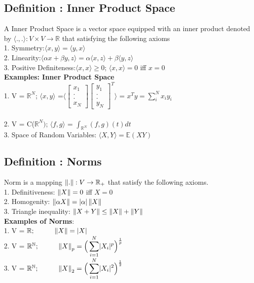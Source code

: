 \documentclass[a4paper,english,12pt]{article}
\newcommand\tab[1][1cm]{\hspace*{#1}}
\begin{document}
\subsection{Definition : Inner Product Space}
A Inner Product Space is a vector space equipped with an inner product denoted by $\langle.,.\rangle:V \times V \rightarrow \mathbb{R}$ that satisfying the following axioms\\
\tab 1. Symmetry:\tab $\langle x,y\rangle = \langle y,x\rangle$\\
\tab 2. Linearity:\tab $\langle\alpha x + \beta y, z\rangle = \alpha\langle x,z\rangle +\beta\langle y,z\rangle$\\
\tab 3. Positive Definiteness:\tab $\langle x,x\rangle\geq 0$; $\langle x,x \rangle = 0$ iff $x=0$\\
\textbf{Examples: Inner Product Space}\\
\tab 1.  V =  $\mathbb{R}^N$;  $\langle x,y\rangle$ =$\langle\begin{bmatrix}x_{1} \\. \\ . \\ x_{N}\end{bmatrix}\begin{bmatrix}y_{1} \\. \\ . \\ y_{N}\end{bmatrix}^{T}\rangle$  = $x^{T}y = \displaystyle{\sum_{i}^{N}x_{i}y_{i}}$\\ \\
\tab 2. V =  C($\mathbb{R}^N)$; $\langle f,g\rangle$  = $\displaystyle{\int_{\mathbb{R}^N}(f,g)(t)dt}$\\
\tab 3. Space of Random Variables:   $\langle X,Y\rangle = \mathbb{E}(XY)$\\
\subsection{Definition : Norms}
Norm is a mapping $\left\lVert.\right\rVert:V\rightarrow \mathbb{R_{+}}$ that satisfy the following axioms.\\
\tab 1. Definitiveness: $\left\lVert X\right\rVert = 0$ iff  $X=0$\\
\tab 2. Homogenity: $\left\lVert\alpha X\right\rVert = \lvert\alpha\rvert\left\lVert X\right\rVert$\\
\tab 3. Triangle inequality: $\left\lVert X+Y\right\rVert\leq\left\lVert X\right\rVert+\left\lVert Y\right\rVert$\\
\textbf{Examples of Norms}:\\
\tab 1.  V = $\mathbb{R};\tab\norm{X} = \abs{X}$\\
\tab 2. V =  $\mathbb{R^N}; \tab  \norm{X}_p = \displaystyle{\Big(\sum_{i=1}^{N}\abs {X_{i}}^p\Big)^\frac{1}{p}}$\\
\tab 3. V =  $\mathbb{R^N}; \tab  \norm{X}_2 = \displaystyle{\Big(\sum_{i=1}^{N}\abs {X_{i}}^2\Big)^\frac{1}{2}}$\\
\end{document}
